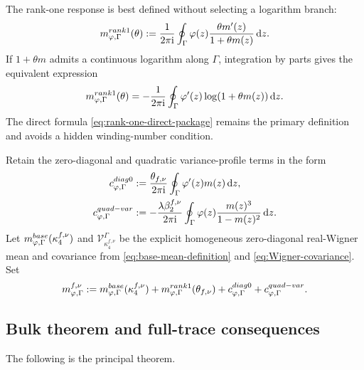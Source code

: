 \documentclass[10pt,a4paper]{amsart}
\newcommand{\ii}{\mathrm i}
\newcommand{\dd}{\mathrm d}
\begin{document}
The rank-one response is best defined without selecting a logarithm branch:
\begin{equation}\label{eq:rank-one-direct-package}
 m_{\varphi,\Gamma}^{\rm rank1}(\theta)
 :=\frac{1}{2\pi\ii}
 \oint_\Gamma
 \varphi(z)\frac{\theta m'(z)}{1+\theta m(z)}\,\dd z.
\end{equation}
If \(1+\theta m\) admits a continuous logarithm along \(\Gamma\), integration
by parts gives the equivalent expression
\begin{equation}\label{eq:rank-one-log-package}
 m_{\varphi,\Gamma}^{\rm rank1}(\theta)
 =-\frac{1}{2\pi\ii}
 \oint_\Gamma
 \varphi'(z)\log(1+\theta m(z))\,\dd z.
\end{equation}
The direct formula \eqref{eq:rank-one-direct-package} remains the primary
definition and avoids a hidden winding-number condition.

Retain the zero-diagonal and quadratic variance-profile terms in the form
\begin{align}
 c_{\varphi,\Gamma}^{\rm diag0}
 &:=\frac{\theta_{f,\nu}}{2\pi\ii}
 \oint_\Gamma\varphi'(z)m(z)\,\dd z,
 \label{eq:diag-package}\\
 c_{\varphi,\Gamma}^{\rm quad-var}
 &:=-\frac{\lambda\beta_2^{f,\nu}}{2\pi\ii}
 \oint_\Gamma
 \varphi(z)\frac{m(z)^3}{1-m(z)^2}\,\dd z.
 \label{eq:quad-package}
\end{align}
Let \(m_{\varphi,\Gamma}^{\rm base}(\kappa_4^{f,\nu})\) and
\(\mathcal V_{\kappa_4^{f,\nu}}^\Gamma\) be the explicit homogeneous
zero-diagonal real-Wigner mean and covariance from
\eqref{eq:base-mean-definition} and \eqref{eq:Wigner-covariance}.
Set
\begin{equation}\label{eq:total-mean-package}
 m_{\varphi,\Gamma}^{f,\nu}
 :=m_{\varphi,\Gamma}^{\rm base}(\kappa_4^{f,\nu})
 +m_{\varphi,\Gamma}^{\rm rank1}(\theta_{f,\nu})
 +c_{\varphi,\Gamma}^{\rm diag0}
 +c_{\varphi,\Gamma}^{\rm quad-var}.
\end{equation}

\subsection{Bulk theorem and full-trace consequences}
\label{subsec:bulk-full-results}

The following is the principal theorem.
\end{document}
